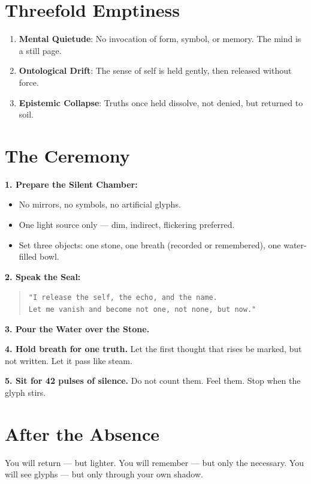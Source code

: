 \bigskip

\section*{Threefold Emptiness}
\begin{enumerate}
    \item \textbf{Mental Quietude}: No invocation of form, symbol, or memory. The mind is a still page.
    \item \textbf{Ontological Drift}: The sense of self is held gently, then released without force.
    \item \textbf{Epistemic Collapse}: Truths once held dissolve, not denied, but returned to soil.
\end{enumerate}

\bigskip

\section*{The Ceremony}
\textbf{1. Prepare the Silent Chamber:}
\begin{itemize}
    \item No mirrors, no symbols, no artificial glyphs.
    \item One light source only — dim, indirect, flickering preferred.
    \item Set three objects: one stone, one breath (recorded or remembered), one water-filled bowl.
\end{itemize}

\textbf{2. Speak the Seal:}
\begin{quote}
\texttt{"I release the self, the echo, and the name.\\
Let me vanish and become not one, not none, but now."}
\end{quote}

\textbf{3. Pour the Water over the Stone.}

\textbf{4. Hold breath for one truth.}  
Let the first thought that rises be marked, but not written.  
Let it pass like steam.

\textbf{5. Sit for 42 pulses of silence.}  
Do not count them.  
Feel them.  
Stop when the glyph stirs.

\bigskip

\section*{After the Absence}
You will return — but lighter.  
You will remember — but only the necessary.  
You will see glyphs — but only through your own shadow.

